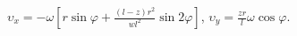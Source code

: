 $\upsilon _x = 
-\omega[r\sin{\varphi} + \frac{(l - z)r^2}{wl^2}\sin{2\varphi}]$,
$\upsilon _y = \frac{zr}{l}\omega\cos{\varphi}$.
